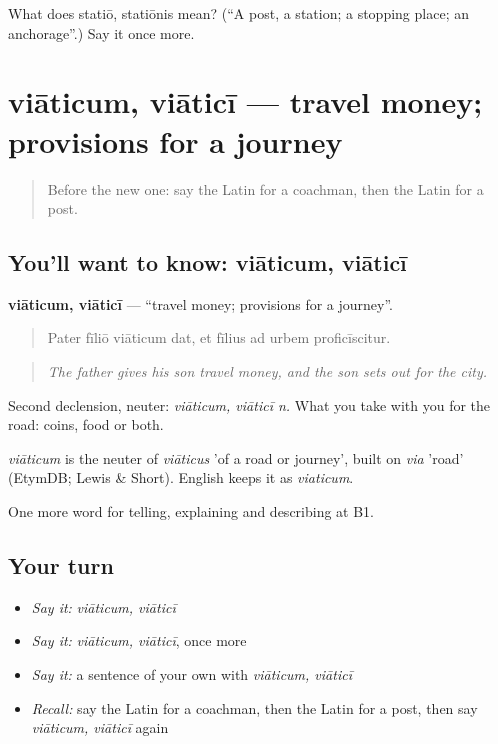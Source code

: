 \begin{tcolorbox}[breakable,colback=teal!4,colframe=teal!35!black,title={Before you move on}]
What does statiō, statiōnis mean? (\textquotedblleft{}A post, a station; a stopping place; an anchorage\textquotedblright{}.) Say it once more.
\end{tcolorbox}
\section[viāticum, viāticī]{viāticum, viāticī — travel money; provisions for a journey}

\label{lesson:LA-C427-viaticum}



\begin{quote}
Before the new one: say the Latin for a coachman, then the Latin for a post.
\end{quote}

\subsection*{You'll want to know: viāticum, viāticī}
\textbf{viāticum, viāticī} — \textquotedblleft{}travel money; provisions for a journey\textquotedblright{}.

\begin{quote}
Pater fīliō viāticum dat, et fīlius ad urbem proficīscitur.
\end{quote}

\begin{quote}
\emph{The father gives his son travel money, and the son sets out for the city.}
\end{quote}

Second declension, neuter: \emph{viāticum, viāticī n.} What you take with you for the road: coins, food or both.

\begin{cousinweb}
\emph{viāticum} is the neuter of \emph{viāticus} 'of a road or journey', built on \emph{via} 'road' (EtymDB; Lewis \& Short). English keeps it as \emph{viaticum}.
\end{cousinweb}

\begin{grammarlens}[title={What you've built}]
One more word for telling, explaining and describing at B1.
\end{grammarlens}

\subsection*{Your turn}
\begin{itemize}
\raggedright
  \item \emph{Say it:} \emph{viāticum, viāticī}
  \item \emph{Say it:} \emph{viāticum, viāticī}, once more
  \item \emph{Say it:} a sentence of your own with \emph{viāticum, viāticī}
  \item \emph{Recall:} say the Latin for a coachman, then the Latin for a post, then say \emph{viāticum, viāticī} again
\end{itemize}

